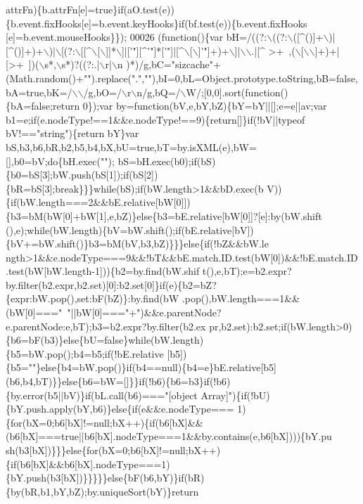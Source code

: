 \begin{DoxyCode}
      attrFn)\{b.attrFn[e]=\textcolor{keyword}{true}\}\textcolor{keywordflow}{if}(aO.test(e))\{b.event.fixHooks[e]=b.event.keyHooks\}\textcolor{keywordflow}{if}(bf.test(e))\{b.event.fixHooks
      [e]=b.event.mouseHooks\}\});
00026 (\textcolor{keyword}{function}()\{var bH=/((?:\(\backslash\)((?:\(\backslash\)([^()]+\(\backslash\))|[^()]+)+\(\backslash\))|\(\backslash\)[(?:\(\backslash\)[[^\(\backslash\)[\(\backslash\)]]*\(\backslash\)]|[\textcolor{stringliteral}{'"][^'}\textcolor{stringliteral}{"]*['"}]|[^\(\backslash\)[\(\backslash\)]\textcolor{stringliteral}{'"]+)+\(\backslash\)]|\(\backslash\)\(\backslash\).|[^
       >+~,(\(\backslash\)[\(\backslash\)\(\backslash\)]+)+|[>+~])(\(\backslash\)s*,\(\backslash\)s*)?((?:.|\(\backslash\)r|\(\backslash\)n
      )*)/g,bC="sizcache"+(Math.random()+"").replace(".",""),bI=0,bL=Object.prototype.toString,bB=false,bA=true,bK=/\(\backslash\)\(\backslash\)/g,bO=/\(\backslash\)r\(\backslash\)n/g,bQ=/\(\backslash\)W/;[0,0].sort(function()\{bA=false;return
       0\});var by=function(bV,e,bY,bZ)\{bY=bY||[];e=e||av;var
       b1=e;if(e.nodeType!==1&&e.nodeType!==9)\{return[]\}if(!bV||typeof bV!=="string")\{return bY\}var
       bS,b3,b6,bR,b2,b5,b4,bX,bU=true,bT=by.isXML(e),bW=[],b0=bV;do\{bH.exec("");
      bS=bH.exec(b0);if(bS)\{b0=bS[3];bW.push(bS[1]);if(bS[2])\{bR=bS[3];break\}\}\}while(bS);if(bW.length>1&&bD.exec(b
      V))\{if(bW.length===2&&bE.relative[bW[0]])\{b3=bM(bW[0]+bW[1],e,bZ)\}else\{b3=bE.relative[bW[0]]?[e]:by(bW.shift
      (),e);while(bW.length)\{bV=bW.shift();if(bE.relative[bV])\{bV+=bW.shift()\}b3=bM(bV,b3,bZ)\}\}\}else\{if(!bZ&&bW.le
      ngth>1&&e.nodeType===9&&!bT&&bE.match.ID.test(bW[0])&&!bE.match.ID.test(bW[bW.length-1]))\{b2=by.find(bW.shif
      t(),e,bT);e=b2.expr?by.filter(b2.expr,b2.set)[0]:b2.set[0]\}if(e)\{b2=bZ?\{expr:bW.pop(),set:bF(bZ)\}:by.find(bW
      .pop(),bW.length===1&&(bW[0]==="~"||bW[0]==="+")&&e.parentNode?e.parentNode:e,bT);b3=b2.expr?by.filter(b2.ex
      pr,b2.set):b2.set;if(bW.length>0)\{b6=bF(b3)\}else\{bU=false\}while(bW.length)\{b5=bW.pop();b4=b5;if(!bE.relative
      [b5])\{b5=""\}else\{b4=bW.pop()\}if(b4==null)\{b4=e\}bE.relative[b5](b6,b4,bT)\}\}else\{b6=bW=[]\}\}if(!b6)\{b6=b3\}if(!b6)\{by.error(b5||bV)\}if(bL.call(b6)==="[object
       Array]")\{if(!bU)\{bY.push.apply(bY,b6)\}else\{if(e&&e.nodeType===
      1)\{for(bX=0;b6[bX]!=null;bX++)\{if(b6[bX]&&(b6[bX]===true||b6[bX].nodeType===1&&by.contains(e,b6[bX])))\{bY.pu
      sh(b3[bX])\}\}\}else\{for(bX=0;b6[bX]!=null;bX++)\{if(b6[bX]&&b6[bX].nodeType===1)\{bY.push(b3[bX])\}\}\}\}\}else\{bF(b6,bY)\}if(bR)\{by(bR,b1,bY,bZ);by.uniqueSort(bY)\}return
}
\end{DoxyCode}
